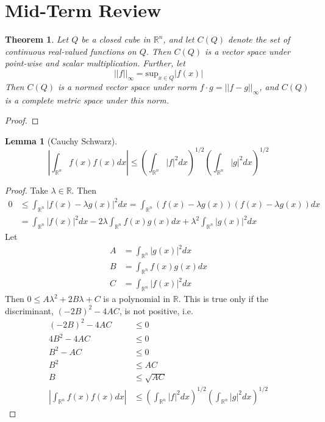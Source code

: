 \documentclass[12pt,leqno]{article}
\numberwithin{equation}{section}
\newtheorem*{Thm}{Theorem}
\theoremstyle{definition}
\newtheorem*{Lem}{Lemma}
\begin{document}
\thispagestyle{plain}
\begin{flushright}

\end{flushright}
{\center\section*{{\huge Mid-Term Review}}}

\begin{Thm}
 Let $Q$ be a closed cube in $\mathbb{R}^n$, and let $C(Q)$ denote the set of continuous real-valued functions on $Q$. Then $C(Q)$ is a vector space under point-wise and scalar multiplication. Further, let \[||f||_{\infty}=\text{sup}_{x\in Q}|f(x)|\] Then $C(Q)$ is a normed vector space under norm $f\cdot g=||f-g||_{\infty}$, and $C(Q)$ is a complete metric space under this norm.
\end{Thm}

\begin{proof}
 
\end{proof}

\begin{Lem}[Cauchy Schwarz]
 \[\left|\int_{\mathbb{R}^n}f(x)f(x)dx\right|\leq\left(\int_{\mathbb{R}^n}|f|^2dx\right)^{1/2}\left(\int_{\mathbb{R}^n}|g|^2dx\right)^{1/2}\]
\end{Lem}

\begin{proof}
 Take $\lambda\in\mathbb{R}$. Then \begin{align*}0&\leq\int_{\mathbb{R}^n}\left|f(x)-\lambda g(x)\right|^2dx=\int_{\mathbb{R}^n}(f(x)-\lambda g(x))(f(x)-\lambda g(x))dx\\&=\int_{\mathbb{R}^n}|f(x)|^2dx-2\lambda\int_{\mathbb{R}^n}f(x)g(x)dx+\lambda^2\int_{\mathbb{R}^n}|g(x)|^2dx\end{align*} Let \begin{align*}A&=\int_{\mathbb{R}^n}|g(x)|^2dx\\B&=\int_{\mathbb{R}^n}f(x)g(x)dx\\C&=\int_{\mathbb{R}^n}|f(x)|^2dx\end{align*} Then $0\leq A\lambda^2+2B\lambda+C$ is a polynomial in $\mathbb{R}$. This is true only if the discriminant, $(-2B)^2-4AC$, is not positive, i.e.\begin{align*}(-2B)^2-4AC&\leq0\\4B^2-4AC&\leq0\\B^2-AC&\leq0\\B^2&\leq AC\\B&\leq\sqrt{AC}\\\left|\int_{\mathbb{R}^n}f(x)f(x)dx\right|&\leq\left(\int_{\mathbb{R}^n}|f|^2dx\right)^{1/2}\left(\int_{\mathbb{R}^n}|g|^2dx\right)^{1/2}\end{align*}
\end{proof}
\end{document}
